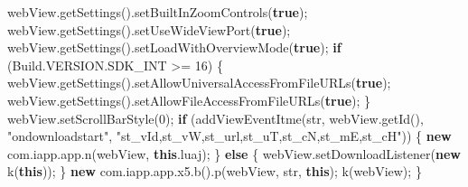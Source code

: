 \documentclass[
]{article}
\newenvironment{Shaded}{}{}
\newcommand{\ControlFlowTok}[1]{\textcolor[rgb]{0.00,0.44,0.13}{\textbf{#1}}}
\newcommand{\DecValTok}[1]{\textcolor[rgb]{0.25,0.63,0.44}{#1}}
\newcommand{\FunctionTok}[1]{\textcolor[rgb]{0.02,0.16,0.49}{#1}}
\newcommand{\KeywordTok}[1]{\textcolor[rgb]{0.00,0.44,0.13}{\textbf{#1}}}
\newcommand{\NormalTok}[1]{#1}
\newcommand{\OperatorTok}[1]{\textcolor[rgb]{0.40,0.40,0.40}{#1}}
\newcommand{\StringTok}[1]{\textcolor[rgb]{0.25,0.44,0.63}{#1}}
\begin{document}
\begin{Shaded}
\begin{Highlighting}[]
\NormalTok{        webView}\OperatorTok{.}\FunctionTok{getSettings}\OperatorTok{().}\FunctionTok{setBuiltInZoomControls}\OperatorTok{(}\KeywordTok{true}\OperatorTok{);}
\NormalTok{        webView}\OperatorTok{.}\FunctionTok{getSettings}\OperatorTok{().}\FunctionTok{setUseWideViewPort}\OperatorTok{(}\KeywordTok{true}\OperatorTok{);}
\NormalTok{        webView}\OperatorTok{.}\FunctionTok{getSettings}\OperatorTok{().}\FunctionTok{setLoadWithOverviewMode}\OperatorTok{(}\KeywordTok{true}\OperatorTok{);}
        \ControlFlowTok{if} \OperatorTok{(}\NormalTok{Build}\OperatorTok{.}\FunctionTok{VERSION}\OperatorTok{.}\FunctionTok{SDK\_INT} \OperatorTok{\textgreater{}=} \DecValTok{16}\OperatorTok{)} \OperatorTok{\{}
\NormalTok{            webView}\OperatorTok{.}\FunctionTok{getSettings}\OperatorTok{().}\FunctionTok{setAllowUniversalAccessFromFileURLs}\OperatorTok{(}\KeywordTok{true}\OperatorTok{);}
\NormalTok{            webView}\OperatorTok{.}\FunctionTok{getSettings}\OperatorTok{().}\FunctionTok{setAllowFileAccessFromFileURLs}\OperatorTok{(}\KeywordTok{true}\OperatorTok{);}
        \OperatorTok{\}}
\NormalTok{        webView}\OperatorTok{.}\FunctionTok{setScrollBarStyle}\OperatorTok{(}\DecValTok{0}\OperatorTok{);}
        \ControlFlowTok{if} \OperatorTok{(}\FunctionTok{addViewEventItme}\OperatorTok{(}\NormalTok{str}\OperatorTok{,}\NormalTok{ webView}\OperatorTok{.}\FunctionTok{getId}\OperatorTok{(),} \StringTok{"ondownloadstart"}\OperatorTok{,} \StringTok{"st\_vId,st\_vW,st\_url,st\_uT,st\_cN,st\_mE,st\_cH"}\OperatorTok{))} \OperatorTok{\{}
            \KeywordTok{new}\NormalTok{ com}\OperatorTok{.}\FunctionTok{iapp}\OperatorTok{.}\FunctionTok{app}\OperatorTok{.}\FunctionTok{n}\OperatorTok{(}\NormalTok{webView}\OperatorTok{,} \KeywordTok{this}\OperatorTok{.}\FunctionTok{luaj}\OperatorTok{);}
        \OperatorTok{\}} \ControlFlowTok{else} \OperatorTok{\{}
\NormalTok{            webView}\OperatorTok{.}\FunctionTok{setDownloadListener}\OperatorTok{(}\KeywordTok{new} \FunctionTok{k}\OperatorTok{(}\KeywordTok{this}\OperatorTok{));}
        \OperatorTok{\}}
        \KeywordTok{new}\NormalTok{ com}\OperatorTok{.}\FunctionTok{iapp}\OperatorTok{.}\FunctionTok{app}\OperatorTok{.}\FunctionTok{x5}\OperatorTok{.}\FunctionTok{b}\OperatorTok{().}\FunctionTok{p}\OperatorTok{(}\NormalTok{webView}\OperatorTok{,}\NormalTok{ str}\OperatorTok{,} \KeywordTok{this}\OperatorTok{);}
        \FunctionTok{k}\OperatorTok{(}\NormalTok{webView}\OperatorTok{);}
    \OperatorTok{\}}


\end{Highlighting}
\end{Shaded}
\end{document}
